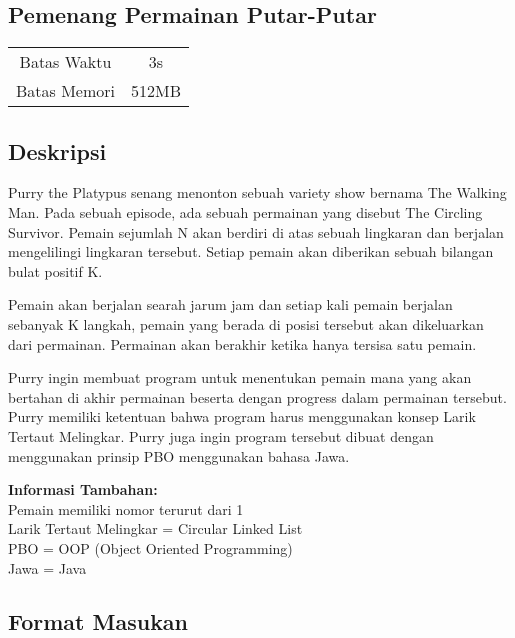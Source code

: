 \documentclass{article}
\begin{document}
\begin{center}

    
    \section*{Pemenang Permainan Putar-Putar} %

    \begin{tabular}{ | c c | }
        \hline
        Batas Waktu  & 3s \\    %
        Batas Memori & 512MB \\  %
        \hline
    \end{tabular}
\end{center}

\subsection*{Deskripsi}

Purry the Platypus senang menonton sebuah variety show bernama The Walking Man. Pada sebuah episode, ada sebuah permainan yang disebut The Circling Survivor.  Pemain sejumlah N akan berdiri di atas sebuah lingkaran dan berjalan mengelilingi lingkaran tersebut.  Setiap pemain akan diberikan sebuah bilangan bulat positif K. 

Pemain akan berjalan searah jarum jam dan setiap kali pemain berjalan sebanyak K langkah, pemain yang berada di posisi tersebut akan dikeluarkan dari permainan. Permainan akan berakhir ketika hanya tersisa satu pemain.

Purry ingin membuat program untuk menentukan pemain mana yang akan bertahan di akhir permainan beserta dengan progress dalam permainan tersebut. Purry memiliki ketentuan bahwa program harus menggunakan konsep Larik Tertaut Melingkar. Purry juga ingin program tersebut dibuat dengan menggunakan prinsip PBO menggunakan bahasa Jawa.

\textbf{Informasi Tambahan:} \\
Pemain memiliki nomor terurut dari 1 \\
Larik Tertaut Melingkar = Circular Linked List \\
PBO = OOP (Object Oriented Programming) \\
Jawa = Java \\

\subsection*{Format Masukan}
\end{document}
